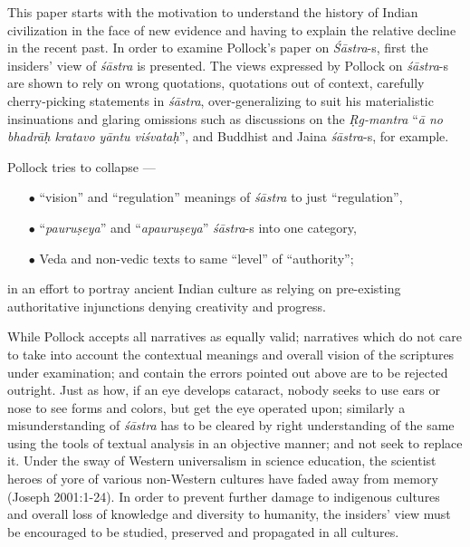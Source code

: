 This paper starts with the motivation to understand the history of Indian civilization in the face of new evidence and having to explain the relative decline in the recent past. In order to examine Pollock's paper on {\sl Śāstra}-s, ﬁrst the insiders' view of {\sl śāstra} is presented. The views expressed by Pollock on {\sl śāstra}-s are shown to rely on wrong quotations, quotations out of context, carefully cherry-picking statements in {\sl śāstra}, over-generalizing to suit his materialistic insinuations and glaring omissions such as discussions on the {\sl Ṛg-mantra} ``{\sl ā no bhadrāḥ kratavo yāntu viśvataḥ}'', and Buddhist and Jaina {\sl śāstra}-s, for example.

Pollock tries to collapse ---
\begin{itemize}
\item[$\bullet$]  ``vision'' and ``regulation'' meanings of {\sl śāstra} to just ``regulation'',

\item[$\bullet$] ``{\sl pauruṣeya}'' and ``{\sl apauruṣeya}'' {\sl śāstra}-s into one category,

\item[$\bullet$] Veda and non-vedic texts to same ``level'' of ``authority'';
\end{itemize}
in an effort to portray ancient Indian culture as relying on pre-existing authoritative injunctions denying creativity and progress.

While Pollock accepts all narratives as equally valid; narratives which do not care to take into account the contextual meanings and overall vision of the scriptures under examination; and contain the errors pointed out above are to be rejected outright. Just as how, if an eye develops cataract, nobody seeks to use ears or nose to see forms and colors, but get the eye operated upon; similarly a misunderstanding of {\sl śāstra} has to be cleared by right understanding of the same using the tools of textual analysis in an objective manner; and not seek to replace it. Under the sway of Western universalism in science education, the scientist heroes of yore of various non-Western cultures have faded away from memory (Joseph 2001:1-24). In order to prevent further damage to indigenous cultures and overall loss of knowledge and diversity to humanity, the insiders' view must be encouraged to be studied, preserved and propagated in all cultures. 

